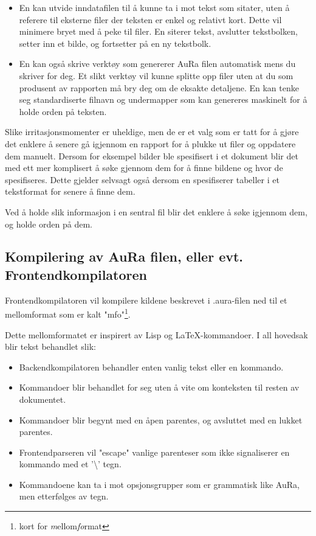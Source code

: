 \documentclass[norsk, 11pt, a4paper]{article}
\begin{document}
\begin{itemize}
\item En kan utvide inndatafilen til å kunne ta i mot tekst som sitater, uten å referere til eksterne filer der teksten er enkel og relativt kort. Dette vil minimere bryet med å peke til filer. En siterer tekst, avslutter tekstbolken, setter inn et bilde, og fortsetter på en ny tekstbolk.
\item En kan også skrive verktøy som genererer AuRa filen automatisk mens du skriver for deg. Et slikt verktøy vil kunne splitte opp filer uten at du som produsent av rapporten må bry deg om de eksakte detaljene. En kan tenke seg standardiserte filnavn og undermapper som kan genereres maskinelt for å holde orden på teksten.
\end{itemize}




Slike irritasjonsmomenter er uheldige, men de er et valg som er tatt for å gjøre det enklere å senere gå igjennom en rapport for å plukke ut filer og oppdatere dem manuelt. Dersom for eksempel bilder ble spesifisert i et dokument blir det med ett mer komplisert å søke gjennom dem for å finne bildene og hvor de spesifiseres. Dette gjelder selvsagt også dersom en spesifiserer tabeller i et tekstformat for senere å finne dem.



Ved å holde slik informasjon i en sentral fil blir det enklere å søke igjennom dem, og holde orden på dem.



\subsection{Kompilering av AuRa filen, eller evt. Frontendkompilatoren}



Frontendkompilatoren vil kompilere kildene beskrevet i .aura-filen ned til et mellomformat som er kalt "mfo"\footnote{kort for \emph{m}ellom\emph{fo}rmat}.



Dette mellomformatet er inspirert av Lisp og LaTeX-kommandoer. I all hovedsak blir tekst behandlet slik:

\begin{itemize}
\item Backendkompilatoren behandler enten vanlig tekst eller en kommando.
\item Kommandoer blir behandlet for seg uten å vite om konteksten til resten av dokumentet.
\item Kommandoer blir begynt med en åpen parentes, og avsluttet med en lukket parentes.
\item Frontendparseren vil "escape" vanlige parenteser som ikke signaliserer en kommando med et '\textbackslash ' tegn.
\item Kommandoene kan ta i mot opsjonsgrupper som er grammatisk like AuRa, men etterfølges av tegn.
\end{itemize}
\end{document}
